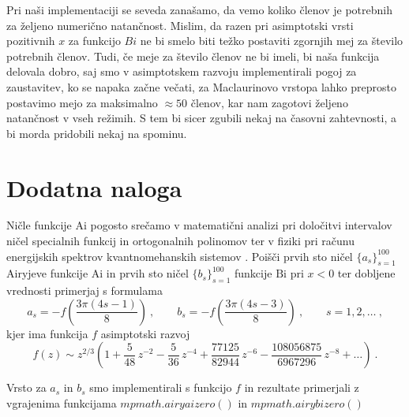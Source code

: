 \documentclass[slovene,11pt,a4paper]{article}
\newcommand{\Ai}{\mathrm{Ai}}
\newcommand{\Bi}{\mathrm{Bi}}
\begin{document}
\newpage
Pri naši implementaciji se seveda zanašamo, da vemo koliko členov je potrebnih za željeno numerično natančnost. Mislim, da razen pri asimptotski vrsti pozitivnih $x$ za funkcijo $Bi$ ne bi smelo biti težko postaviti zgornjih mej za število potrebnih členov. Tudi, če meje za število členov ne bi imeli, bi naša funkcija delovala dobro, saj smo v asimptotskem razvoju implementirali pogoj za zaustavitev, ko se napaka začne večati, za Maclaurinovo vrstopa lahko preprosto postavimo mejo za maksimalno $\approx 50$ členov, kar nam zagotovi željeno natančnost v vseh režimih. S tem bi sicer zgubili nekaj na časovni zahtevnosti, a bi morda pridobili nekaj na spominu.

\section{Dodatna naloga}

Ničle funkcije $\Ai$ pogosto srečamo v matematični
analizi pri določitvi intervalov ničel specialnih funkcij
in ortogonalnih polinomov \cite{1_szego} ter v fiziki pri računu
energijskih spektrov kvantnomehanskih sistemov \cite{1_landauQM}.
Poišči prvih sto ničel $\{a_s\}_{s=1}^{100}$ Airyjeve
funkcije $\Ai$ in prvih sto ničel $\{b_s\}_{s=1}^{100}$
funkcije $\Bi$ pri $x<0$ ter dobljene vrednosti primerjaj s formulama
%
\begin{equation*}
  a_s = - f \left( \frac{3\pi(4s-1)}{8} \right) \>, \qquad
  b_s = - f \left( \frac{3\pi(4s-3)}{8} \right) \>, \qquad s = 1,2,\ldots \>,
\end{equation*}
%
kjer ima funkcija $f$ asimptotski razvoj \cite{1_abram}
%
\begin{equation*}
  f(z) \sim z^{2/3} \left(
  1 + \frac{5}{48} \, z^{-2}
  -\frac{5}{36} \, z^{-4}
  +\frac{77125}{82944} \, z^{-6}
  -\frac{108056875}{6967296} \, z^{-8} + \ldots\right) \>.
\end{equation*}

Vrsto za $a_s$ in $b_s$ smo implementirali s funkcijo $f$ in rezultate primerjali z vgrajenima funkcijama $mpmath.airyaizero()$ in $mpmath.airybizero()$
\end{document}
